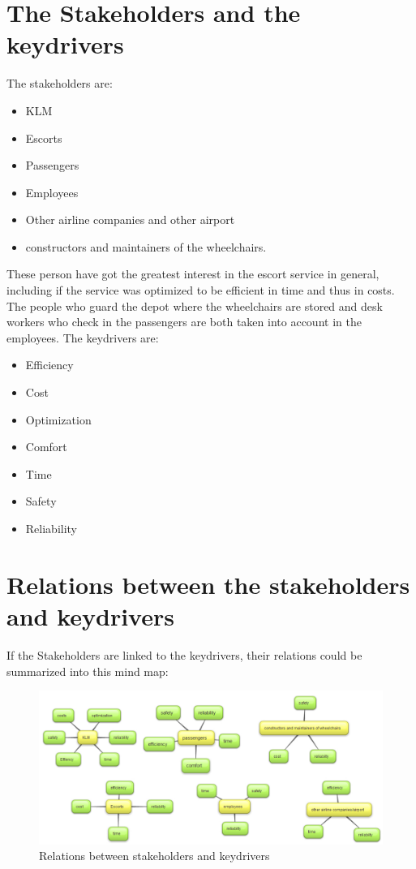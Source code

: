 \documentclass[a4paper, 11pt, notitlepage]{report}
\begin{document}
\section{The Stakeholders and the keydrivers }
The stakeholders are:
\begin{itemize}
 \item KLM
 \item Escorts
 \item Passengers
 \item Employees
 \item Other airline companies and other airport
 \item  constructors and maintainers of the wheelchairs.
\end{itemize}
These person have got the greatest interest in the escort service in general, including if the service was optimized to be efficient in time and thus in costs. The people who guard the depot where the wheelchairs are stored and desk workers who check in the passengers are both taken into account in the employees. The keydrivers are:
\begin{itemize}
	\item Efficiency
	\item Cost
	\item Optimization
	\item Comfort
	\item Time
	\item Safety
	\item Reliability
\end{itemize}
\section{Relations between the stakeholders and keydrivers}
If the Stakeholders are linked to the keydrivers, their relations could be summarized into this mind map:
\begin{center}
\begin{figure}[!h]
\caption[Relations between stakeholders and keydrivers for lof]{Relations between stakeholders and keydrivers}
\includegraphics[scale=0.4]{figures/relationstakeholders.jpg}
\end{figure}
\end{center}
\end{document}
